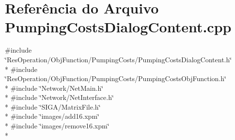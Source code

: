 \section{Referência do Arquivo Pumping\+Costs\+Dialog\+Content.\+cpp}
\label{_obj_function_2_pumping_costs_2_pumping_costs_dialog_content_8cpp}
{\ttfamily \#include \char`\"{}Res\+Operation/\+Obj\+Function/\+Pumping\+Costs/\+Pumping\+Costs\+Dialog\+Content.\+h\char`\"{}}\\*
{\ttfamily \#include \char`\"{}Res\+Operation/\+Obj\+Function/\+Pumping\+Costs/\+Pumping\+Costs\+Obj\+Function.\+h\char`\"{}}\\*
{\ttfamily \#include \char`\"{}Network/\+Net\+Main.\+h\char`\"{}}\\*
{\ttfamily \#include \char`\"{}Network/\+Net\+Interface.\+h\char`\"{}}\\*
{\ttfamily \#include \char`\"{}S\+I\+G\+A/\+Matrix\+File.\+h\char`\"{}}\\*
{\ttfamily \#include \char`\"{}images/add16.\+xpm\char`\"{}}\\*
{\ttfamily \#include \char`\"{}images/remove16.\+xpm\char`\"{}}\\*
